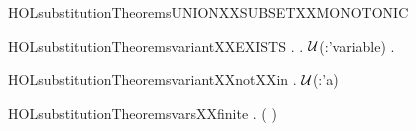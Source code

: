 \newcommand{\HOLsubstitutionTheoremsunfoldXXnuXXLEM}{\UseVerbatim{HOLsubstitutionTheoremsunfoldXXnuXXLEM}}
\begin{SaveVerbatim}{HOLsubstitutionTheoremsUNIONXXSUBSETXXMONOTONIC}
\HOLTokenTurnstile{}  \HOLConst{\HOLTokenSubset{}}  \HOLSymConst{\HOLTokenImp{}}  \HOLConst{\HOLTokenSubset{}}  \HOLSymConst{\HOLTokenImp{}}  \HOLConst{\HOLTokenUnion{}}  \HOLConst{\HOLTokenSubset{}}  \HOLConst{\HOLTokenUnion{}} 
\end{SaveVerbatim}
\newcommand{\HOLsubstitutionTheoremsUNIONXXSUBSETXXMONOTONIC}{\UseVerbatim{HOLsubstitutionTheoremsUNIONXXSUBSETXXMONOTONIC}}
\begin{SaveVerbatim}{HOLsubstitutionTheoremsvariantXXEXISTS}
\HOLTokenTurnstile{} \HOLSymConst{\HOLTokenExists{}}.
     \HOLSymConst{\HOLTokenForall{}}.
        \ensuremath{\cal{U}}(:'variable) \HOLSymConst{\HOLTokenImp{}}
         \HOLSymConst{\HOLTokenImp{}}
       \HOLSymConst{\HOLTokenForall{}}.    \HOLConst{\HOLTokenNotIn{}} 
\end{SaveVerbatim}
\newcommand{\HOLsubstitutionTheoremsvariantXXEXISTS}{\UseVerbatim{HOLsubstitutionTheoremsvariantXXEXISTS}}
\begin{SaveVerbatim}{HOLsubstitutionTheoremsvariantXXnotXXin}
\HOLTokenTurnstile{} \HOLSymConst{\HOLTokenForall{}} .
      \ensuremath{\cal{U}}(:'a) \HOLSymConst{\HOLTokenImp{}}   \HOLSymConst{\HOLTokenImp{}}    \HOLConst{\HOLTokenNotIn{}} 
\end{SaveVerbatim}
\newcommand{\HOLsubstitutionTheoremsvariantXXnotXXin}{\UseVerbatim{HOLsubstitutionTheoremsvariantXXnotXXin}}
\begin{SaveVerbatim}{HOLsubstitutionTheoremsvarsXXfinite}
\HOLTokenTurnstile{} \HOLSymConst{\HOLTokenForall{}}.  ( )
\end{SaveVerbatim}
\newcommand{\HOLsubstitutionTheoremsvarsXXfinite}{\UseVerbatim{HOLsubstitutionTheoremsvarsXXfinite}}
